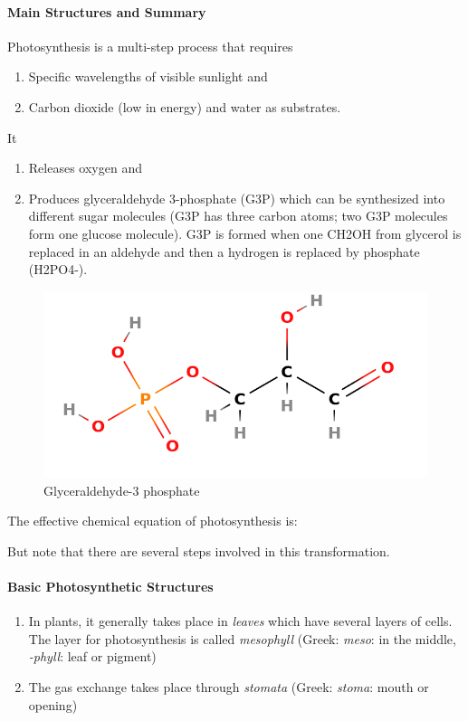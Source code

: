 \documentclass[12pt]{article}
\begin{document}
\paragraph{Main Structures and Summary}
Photosynthesis is a multi-step process that requires
\begin{enumerate}
    \item Specific wavelengths of visible sunlight and
    \item Carbon dioxide (low in energy) and water as substrates.
\end{enumerate}
It 
\begin{enumerate}
    \item Releases oxygen and
    \item Produces glyceraldehyde 3-phosphate (G3P) which can be synthesized into different sugar molecules (G3P has three carbon atoms; two G3P molecules form one glucose molecule). G3P is formed when one CH2OH from glycerol is replaced in an aldehyde and then a hydrogen is replaced by phosphate (H2PO4-).
\end{enumerate}
\begin{figure}[ht!]
    \centering
    \includegraphics[width=0.8\linewidth]{g3p.png}
    \caption{Glyceraldehyde-3 phosphate}
    \label{fig: g3p}
\end{figure}

The effective chemical equation of photosynthesis is:


But note that there are several steps involved in this transformation.

\paragraph{Basic Photosynthetic Structures}
\begin{enumerate}
    \item In plants, it generally takes place in \emph{leaves} which have several layers of cells. The layer for photosynthesis is called \emph{mesophyll} (Greek: \emph{meso}: in the middle, \emph{-phyll}: leaf or pigment)
    \item The gas exchange takes place through \emph{stomata} (Greek: \emph{stoma}: mouth or opening)
\end{enumerate}
\end{document}

